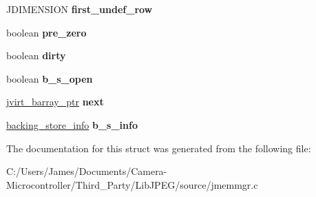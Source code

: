 \begin{DoxyCompactItemize}
J\+D\+I\+M\+E\+N\+S\+I\+ON {\bfseries first\+\_\+undef\+\_\+row}
\item 
\mbox{\label{structjvirt__barray__control_a385a56e2499279ae94ba3b818c6795f9}} 
boolean {\bfseries pre\+\_\+zero}
\item 
\mbox{\label{structjvirt__barray__control_aa544a71dce60a3eefcfcf189170eca92}} 
boolean {\bfseries dirty}
\item 
\mbox{\label{structjvirt__barray__control_a03c4b5b5d8c5855cc6878a9728d7f685}} 
boolean {\bfseries b\+\_\+s\+\_\+open}
\item 
\mbox{\label{structjvirt__barray__control_a05ddd9826f01b158c5f9b51fa514239d}} 
\hyperlink{structjvirt__barray__control}{jvirt\+\_\+barray\+\_\+ptr} {\bfseries next}
\item 
\mbox{\label{structjvirt__barray__control_ace5a2d0508aee931405de00db46a728a}} 
\hyperlink{structbacking__store__struct}{backing\+\_\+store\+\_\+info} {\bfseries b\+\_\+s\+\_\+info}
\end{DoxyCompactItemize}


The documentation for this struct was generated from the following file\+:\begin{DoxyCompactItemize}
\item 
C\+:/\+Users/\+James/\+Documents/\+Camera-\/\+Microcontroller/\+Third\+\_\+\+Party/\+Lib\+J\+P\+E\+G/source/jmemmgr.\+c\end{DoxyCompactItemize}
